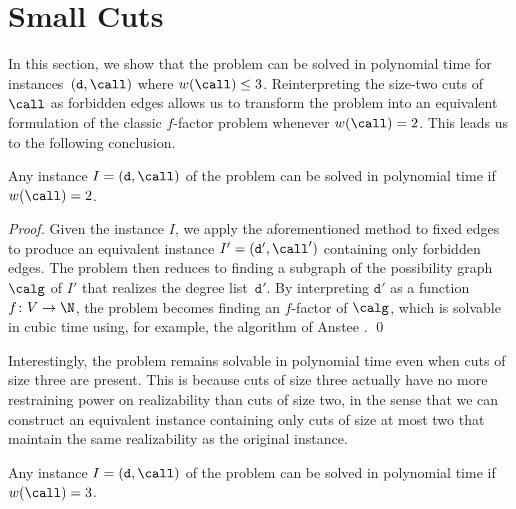 \section{Small Cuts}
\label{sec:small_cuts}

In this section, we show that the \GRC{} problem can be solved in polynomial time for instances~$(\texttt{d}, \call)$ where $w(\call) \leq 3$.
%
Reinterpreting the size-two cuts of $\call$ as forbidden edges allows us to transform the \GRC{} problem into an equivalent formulation of the classic $f$-factor problem whenever $w(\call) = 2$. This leads us to the following conclusion.

\begin{lemma}
\label{thm:size2}
    Any instance $I=(\texttt{d}, \call)$ of the \GRC{} problem can be solved in polynomial time if $w(\call) = 2$.
\end{lemma}

\begin{proof}
    Given the instance $I$, we apply the aforementioned method to fixed edges to produce an equivalent instance $I'=(\texttt{d}', \call')$ containing only forbidden edges.
    The problem then reduces to finding a subgraph of the possibility graph $\calg$ of $I'$ that realizes the degree list~$\texttt{d}'$.
    By interpreting $\texttt{d}'$ as a function $f \colon V \to \N$, the problem becomes finding an $f$-factor of $\calg$, which is solvable in cubic time using, for example, the algorithm of Anstee \cite{Ans85}. \qed
\end{proof}

Interestingly, the \GRC{} problem remains solvable in polynomial time even when cuts of size three are present.
This is because cuts of size three actually have no more restraining power on realizability than cuts of size two, in the sense that we can construct an equivalent instance containing only cuts of size at most two that maintain the same realizability as the original instance.



\begin{theorem}
\label{thm:size3}
    Any instance $I=(\texttt{d}, \call)$ of the \GRC{} problem can be solved in polynomial time if $w(\call) = 3$.
\end{theorem}


